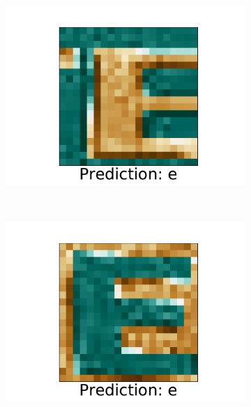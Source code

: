\documentclass[../main.tex]{subfiles}
\begin{document}
\begin{figure}
    \centering
    \begin{subfigure}[t]{0.15\textwidth}
        \includegraphics[width=\textwidth]{figures/ex/p_0.pdf}
        \label{fig:gull}
    \end{subfigure}
    ~ 
    \begin{subfigure}[t]{0.15\textwidth}
        \includegraphics[width=\textwidth]{figures/ex/p_1.pdf}
        \label{fig:gull}
    \end{subfigure}
    ~ 
    \begin{subfigure}[t]{0.15\textwidth}

\end{subfigure}
\end{figure}
\end{document}
